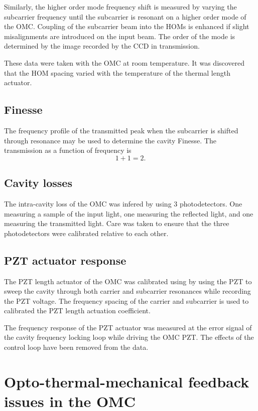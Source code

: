 Similarly, the higher order mode frequency shift is measured by varying the subcarrier frequency until the subcarrier is resonant on a higher order mode of the OMC. %
Coupling of the subcarrier beam into the HOMs is enhanced if slight misalignments are introduced on the input beam. %
The order of the mode is determined by the image recorded by the CCD in transmission.


These data were taken with the OMC at room temperature. %
It was discovered that the HOM spacing varied with the temperature of the thermal length actuator. %

\subsection{Finesse}

The frequency profile of the transmitted peak when the subcarrier is shifted through resonance may be used to determine the cavity Finesse. %
The transmission as a function of frequency is
\begin{equation}
1+1=2.
\end{equation}


\subsection{Cavity losses}
The intra-cavity loss of the OMC was infered by using 3 photodetectors. %
One measuring a sample of the input light, one measuring the reflected light, and one measuring the transmitted light. %
Care was taken to ensure that the three photodetectors were calibrated relative to each other.


\subsection{PZT actuator response}
The PZT length actuator of the OMC was calibrated using by using the PZT to sweep the cavity through both carrier and subcarrier resonances while recording the PZT voltage. %
The frequency spacing of the carrier and subcarrier is used to calibrated the PZT length actuation coefficient.


The frequency response of the PZT actuator was measured at the error signal of the cavity frequency locking loop while driving the OMC PZT. %
The effects of the control loop have been removed from the data.


\section{Opto-thermal-mechanical feedback issues in the OMC}


